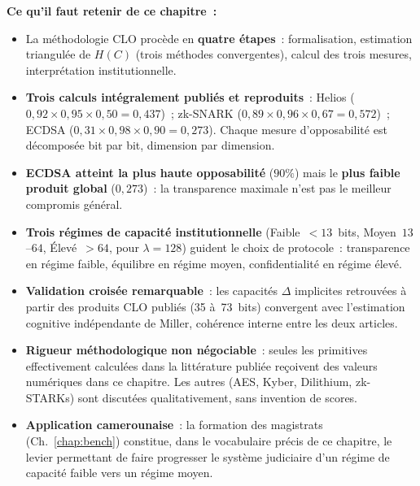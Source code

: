 \begin{boxresume}
\textbf{Ce qu'il faut retenir de ce chapitre~:}
\begin{itemize}
    \item La méthodologie CLO procède en \textbf{quatre étapes}~:
          formalisation, estimation triangulée de $H(C)$ (trois
          méthodes convergentes), calcul des trois mesures,
          interprétation institutionnelle.

    \item \textbf{Trois calculs intégralement publiés et reproduits}~:
          Helios ($0{,}92 \times 0{,}95 \times 0{,}50 = 0{,}437$)~;
          zk-SNARK ($0{,}89 \times 0{,}96 \times 0{,}67 = 0{,}572$)~;
          ECDSA ($0{,}31 \times 0{,}98 \times 0{,}90 = 0{,}273$).
          Chaque mesure d'opposabilité est décomposée bit par bit,
          dimension par dimension.

    \item \textbf{ECDSA atteint la plus haute opposabilité} ($90\%$)
          mais le \textbf{plus faible produit global} ($0{,}273$)~:
          la transparence maximale n'est pas le meilleur compromis
          général.

    \item \textbf{Trois régimes de capacité institutionnelle}
          (Faible~$<13$~bits, Moyen~$13$--$64$, Élevé~$>64$, pour
          $\lambda=128$) guident le choix de protocole~: transparence
          en régime faible, équilibre en régime moyen, confidentialité
          en régime élevé.

    \item \textbf{Validation croisée remarquable}~: les capacités
          $\Delta$ implicites retrouvées à partir des produits CLO
          publiés (35 à~73~bits) convergent avec l'estimation
          cognitive indépendante de Miller, cohérence interne
          entre les deux articles.

    \item \textbf{Rigueur méthodologique non négociable}~: seules
          les primitives effectivement calculées dans la littérature
          publiée reçoivent des valeurs numériques dans ce chapitre.
          Les autres (AES, Kyber, Dilithium, zk-STARKs) sont
          discutées qualitativement, sans invention de scores.

    \item \textbf{Application camerounaise}~: la formation des
          magistrats (Ch.~\ref{chap:bench}) constitue, dans le
          vocabulaire précis de ce chapitre, le levier permettant
          de faire progresser le système judiciaire d'un régime
          de capacité faible vers un régime moyen.
\end{itemize}
\end{boxresume}

